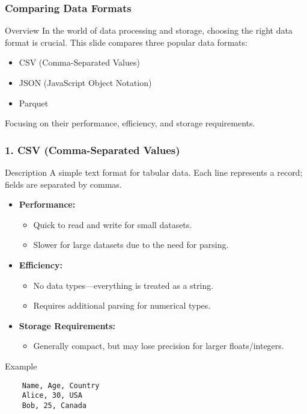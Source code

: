 \documentclass[aspectratio=169]{beamer}
\begin{document}
\begin{frame}
    \frametitle{Comparing Data Formats}
    \begin{block}{Overview}
        In the world of data processing and storage, choosing the right data format is crucial. 
        This slide compares three popular data formats:
        \begin{itemize}
            \item CSV (Comma-Separated Values)
            \item JSON (JavaScript Object Notation)
            \item Parquet
        \end{itemize}
        Focusing on their performance, efficiency, and storage requirements.
    \end{block}
\end{frame}

\begin{frame}[fragile]
    \frametitle{1. CSV (Comma-Separated Values)}
    \begin{block}{Description}
        A simple text format for tabular data. Each line represents a record; fields are separated by commas.
    \end{block}
    \begin{itemize}
        \item \textbf{Performance:}
        \begin{itemize}
            \item Quick to read and write for small datasets.
            \item Slower for large datasets due to the need for parsing.
        \end{itemize}
        \item \textbf{Efficiency:} 
        \begin{itemize}
            \item No data types—everything is treated as a string.
            \item Requires additional parsing for numerical types.
        \end{itemize}
        \item \textbf{Storage Requirements:} 
        \begin{itemize}
            \item Generally compact, but may lose precision for larger floats/integers.
        \end{itemize}
    \end{itemize}
    \begin{block}{Example}
    \begin{lstlisting}
    Name, Age, Country
    Alice, 30, USA
    Bob, 25, Canada
    \end{lstlisting}
    \end{block}
\end{frame}
\end{document}
